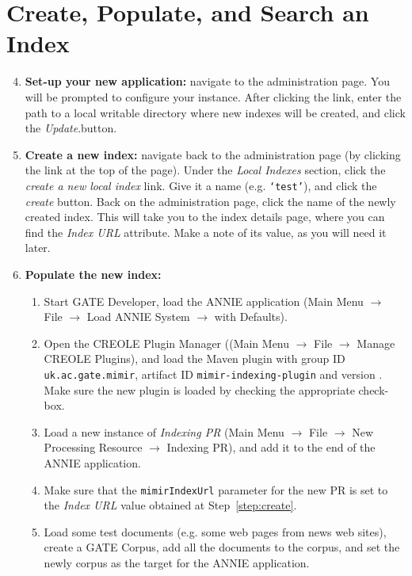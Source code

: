 \section{Create, Populate, and Search an Index}
%
\begin{enumerate}
\setcounter{enumi}{3}
  \item {\bf Set-up your new \Mimir{} application:}
  navigate to the administration page. You will be prompted to configure your
  \Mimir{} instance. After clicking the link, enter the path to a local writable directory
  where new indexes will be created, and click the {\em Update}.button.
  \item \label{step:create} {\bf Create a new index:} navigate back to the
  administration page (by clicking the link at the top of the page). Under the {\em Local Indexes}
  section, click the {\em create a new local index} link. Give it a name (e.g.
  {\tt `test'}), and click the {\em create} button. Back on the administration
  page, click the name of the newly created index. This will take you to the
  index details page, where you can find the {\em Index URL} attribute. Make a
  note of its value, as you will need it later.
  \item {\bf Populate the new index:} 
  \begin{enumerate}
    \item Start GATE Developer, load the ANNIE application (Main Menu 
    $\rightarrow$ File $\rightarrow$ Load ANNIE System $\rightarrow$ with
    Defaults).
    \item Open the CREOLE Plugin Manager ((Main Menu $\rightarrow$ File
    $\rightarrow$ Manage CREOLE Plugins), and load the Maven plugin with
    group ID {\tt uk.ac.gate.mimir}, artifact ID {\tt mimir-indexing-plugin}
    and version {\tt \mimirversion}. Make sure the new plugin is loaded by
    checking the appropriate check-box.
    \item Load a new instance of {\em \Mimir{} Indexing PR} (Main Menu
    $\rightarrow$ File $\rightarrow$ New Processing Resource $\rightarrow$
    \Mimir{} Indexing PR), and add it to the end of the ANNIE application.
    \item Make sure that the {\tt mimirIndexUrl} parameter for the new PR is set
    to the {\em Index URL} value obtained at Step~\ref{step:create}.
    \item Load some test documents (e.g. some web pages from news web sites),
    create a GATE Corpus, add all the documents to the corpus, and set the
    newly corpus as the target for the ANNIE application.

\end{enumerate}
\end{enumerate}
